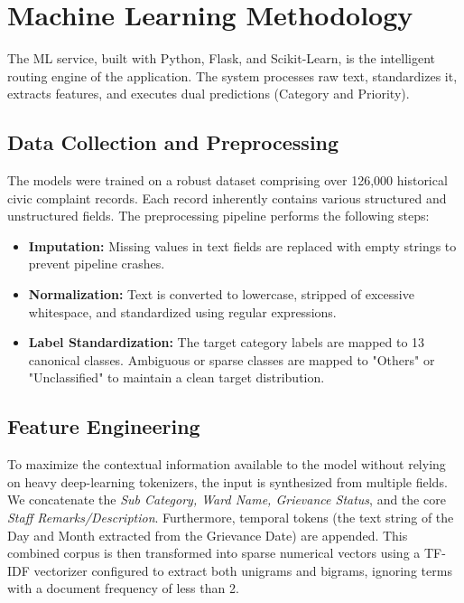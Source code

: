 \documentclass[conference]{IEEEtran}
\begin{document}
\section{Machine Learning Methodology}

The ML service, built with Python, Flask, and Scikit-Learn, is the intelligent routing engine of the application. The system processes raw text, standardizes it, extracts features, and executes dual predictions (Category and Priority).

\subsection{Data Collection and Preprocessing}
The models were trained on a robust dataset comprising over 126,000 historical civic complaint records. Each record inherently contains various structured and unstructured fields. The preprocessing pipeline performs the following steps:
\begin{itemize}
    \item \textbf{Imputation:} Missing values in text fields are replaced with empty strings to prevent pipeline crashes.
    \item \textbf{Normalization:} Text is converted to lowercase, stripped of excessive whitespace, and standardized using regular expressions.
    \item \textbf{Label Standardization:} The target category labels are mapped to 13 canonical classes. Ambiguous or sparse classes are mapped to "Others" or "Unclassified" to maintain a clean target distribution.
\end{itemize}

\subsection{Feature Engineering}
To maximize the contextual information available to the model without relying on heavy deep-learning tokenizers, the input is synthesized from multiple fields. We concatenate the \textit{Sub Category, Ward Name, Grievance Status}, and the core \textit{Staff Remarks/Description}. Furthermore, temporal tokens (the text string of the Day and Month extracted from the Grievance Date) are appended. This combined corpus is then transformed into sparse numerical vectors using a TF-IDF vectorizer configured to extract both unigrams and bigrams, ignoring terms with a document frequency of less than 2.
\end{document}
